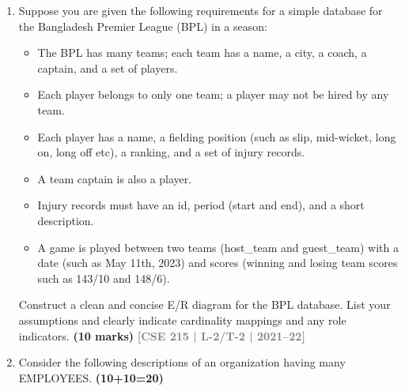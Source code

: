 \documentclass[12pt,a3paper]{article}
\newcommand{\yr}[1]{\hfill\textcolor{gray}{\small\textbf{[#1]}}}
\newcommand{\mk}[1]{\textcolor{orange!70!black}{\small\textbf{(#1 marks)}}}
\begin{document}
\begin{enumerate}
\item Suppose you are given the following requirements for a simple database for the Bangladesh Premier League (BPL) in a season:
\begin{itemize}[leftmargin=1.5em,itemsep=1pt]
  \item The BPL has many teams; each team has a name, a city, a coach, a captain, and a set of players.
  \item Each player belongs to only one team; a player may not be hired by any team.
  \item Each player has a name, a fielding position (such as slip, mid-wicket, long on, long off etc), a ranking, and a set of injury records.
  \item A team captain is also a player.
  \item Injury records must have an id, period (start and end), and a short description.
  \item A game is played between two teams (host\_team and guest\_team) with a date (such as May 11th, 2023) and scores (winning and losing team scores such as 143/10 and 148/6).
\end{itemize}
Construct a clean and concise E/R diagram for the BPL database. List your assumptions and clearly indicate cardinality mappings and any role indicators.
\mk{10} \yr{CSE 215 | L-2/T-2 | 2021--22}

\item Consider the following descriptions of an organization having many EMPLOYEES. \hfill \textbf{(10+10=20)}


\end{enumerate}
\end{document}
